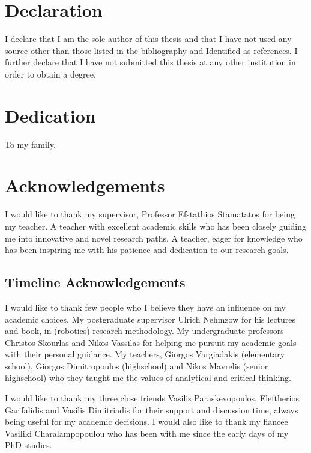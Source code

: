 \documentclass[
    12pt, %
    singlespacing, %
    liststotoc, %
    headsepline, %
]{DoctoralThesis} %
\begin{document}
\section*{Declaration}
I declare that I am the sole author of this thesis and that I have not used any source other than those listed in the bibliography and Identified as references. I further declare that I have not submitted this thesis at any other institution in order to obtain a degree.

\newpage


\section*{Dedication}
To my family.

\newpage
 

\section*{Acknowledgements}
I would like to thank my supervisor, Professor Efstathios Stamatatos for being my teacher. A teacher with excellent academic skills who has been closely guiding me into innovative and novel research paths. A teacher, eager for knowledge who has been inspiring me with his patience and dedication to our research goals. 

\subsection*{Timeline Acknowledgements}
I would like to thank few people who I believe they have an influence on my academic choices. My postgraduate supervisor Ulrich Nehmzow for his lectures and book, in (robotics) research methodology. My undergraduate professors Christos Skourlas and Nikos Vassilas for helping me pursuit my academic goals with their personal guidance. My teachers, Giorgos Vargiadakis (elementary school), Giorgos Dimitropoulos (highschool) and Nikos Mavrelis (senior highschool) who they taught me the values of analytical and critical thinking. 

I would like to thank my three close friends Vasilis Paraskevopoulos, Eleftherios Garifalidis and Vasilis Dimitriadis for their support and discussion time, always being useful for my academic decisions. I would also like to thank my fiancee Vasiliki Charalampopoulou who has been with me since the early days of my PhD studies.
\end{document}
